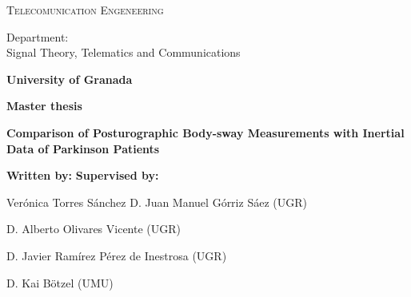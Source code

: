\begin{titlepage}
\label{ch:cover}
\begin{center}

{\Large\textsc{Telecomunication Engeneering}}


Department:  \\ Signal Theory, Telematics and Communications

\textbf{University of Granada}


\vspace{0.5cm}

\begin{figure}[h]
	\centering
	\label{fig:ugr}
\end{figure}


\vspace{0.5cm}
\textbf{Master thesis}


\vspace{0.9cm}


{\Huge\textbf{Comparison of Posturographic Body-sway Measurements with Inertial Data of Parkinson Patients }}


\end{center}


\vspace{1.5cm}
\textbf{Written by:}  \hfill \textbf{Supervised by:}

Ver\'onica Torres S\'anchez \hfill    D. Juan Manuel Górriz Sáez (UGR)

							\hfill	  D. Alberto Olivares Vicente (UGR) 
							
							\hfill   D. Javier Ramírez Pérez de Inestrosa (UGR)
							
							\hfill	  D. Kai Bötzel (UMU)


\end{titlepage}
